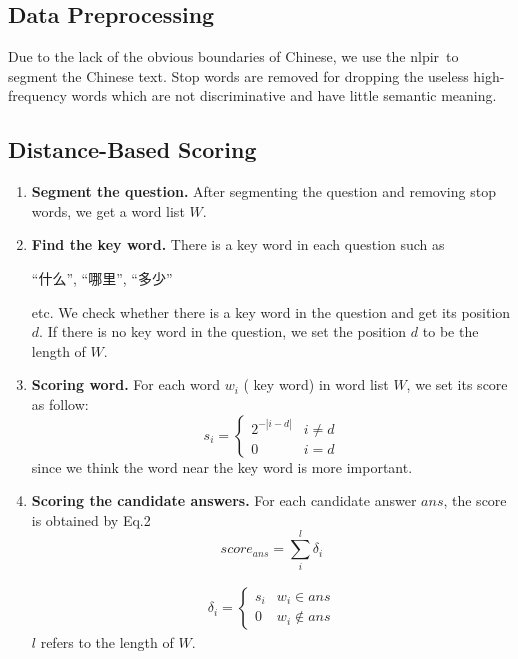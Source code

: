 \documentclass{llncs}
\begin{document}
\subsection{Data Preprocessing}
Due to the lack of the obvious boundaries of Chinese, we use the nlpir\footnotemark\ to
segment the Chinese text. Stop words are removed for dropping the useless high-frequency 
words which are not discriminative and have little semantic meaning.



\subsection{Distance-Based Scoring}

\begin{enumerate}
  \item \textbf{Segment the question.} After segmenting the question and removing stop words, we get a word list $W$.
  \item \textbf{Find the key word.} There is a key word in each question such as 
\begin{CJK}{UTF8}{gbsn}
“什么”, “哪里”, “多少”
\end{CJK}
 etc. We check whether there is a key word in the question and get its position $d$. If there is no key word in the question, we set the position $d$ to be the length of $W$.
  \item \textbf{Scoring word.} For each word $w_i$ ( key word) in word list $W$, we set its score as follow: 
  \begin{equation}
    s_i = \begin{cases}2^{-|i-d|} & i \ne d \\ 0 & i = d \end{cases}
  \end{equation}
  since we think the word near the key word is more important.
  \item \textbf{Scoring the candidate answers.} For each candidate answer $ans$, the score is obtained by Eq.2 
  \begin{equation}
    score_{ans} = \sum_i^l{\delta_i}
  \end{equation}

  \begin{equation}
  \begin{aligned}
  \delta_i = \begin{cases}s_i & w_i \in ans \\ 0 & w_i \notin ans  \end{cases}
  \end{aligned}
  \end{equation}
  $l$ refers to the length of $W$.
\end{enumerate}
\end{document}
